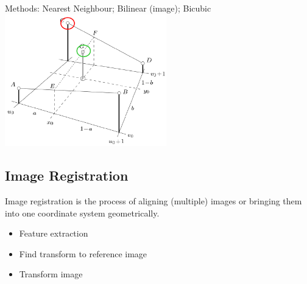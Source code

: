 \begin{minipage}{9cm}
  Methods: Nearest Neighbour; Bilinear (image); Bicubic\\
  \includegraphics[width=7cm]{./images/bilinear_interpolation.png}
  
  \subsection{Image Registration}
  Image registration is the process of aligning (multiple) images or bringing them into one coordinate 
  system geometrically.
  \begin{itemize}
    \item Feature extraction
    \item Find transform to reference image
    \item Transform image
  \end{itemize}
\end{minipage}

